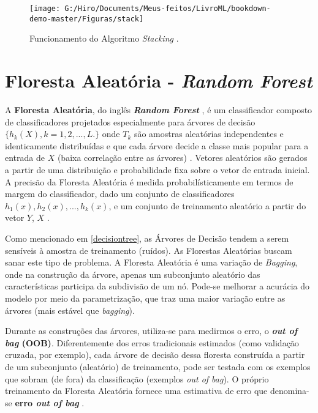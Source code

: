 \documentclass[
  openany]{book}
\begin{document}
\begin{figure}

{\centering \texttt{[image: G:/Hiro/Documents/Meus-feitos/LivroML/bookdown-demo-master/Figuras/stack]} 

}

\caption{Funcionamento do Algoritmo \emph{Stacking} \citep{bernardini2002combinaccao}.}\label{fig:stack}
\end{figure}



\hypertarget{rf}{%
\section{\texorpdfstring{Floresta Aleatória - \emph{Random Forest}}{Floresta Aleatória - Random Forest}}\label{rf}}

A \textbf{Floresta Aleatória}, do inglês \textbf{\emph{Random Forest}} \citep{breiman2001random, liaw2002classification}, é um classificador composto de classificadores projetados especialmente para árvores de decisão \(\{h_k(X),k=1,2,...,L.\}\) onde \(T_k\) são amostras aleatórias independentes e identicamente distribuídas e que cada árvore decide a classe mais popular para a entrada de \(X\) (baixa correlação entre as árvores) . Vetores aleatórios são gerados a partir de uma distribuição e probabilidade fixa sobre o vetor de entrada inicial. A precisão da Floresta Aleatória é medida probabilísticamente em termos de margem do classificador, dado um conjunto de classificadores \(h_1(x), h_2(x),...,h_k(x)\), e um conjunto de treinamento aleatório a partir do vetor \(Y\), \(X\) \citep{gomez2012random}.

Como mencionado em \ref{decisiontree}, as Árvores de Decisão tendem a serem sensíveis à amostra de treinamento (ruídos). As Florestas Aleatórias buscam sanar este tipo de problema. A Floresta Aleatória é uma variação de \emph{Bagging}, onde na construção da árvore, apenas um subconjunto aleatório das características participa da subdivisão de um nó. Pode-se melhorar a acurácia do modelo por meio da parametrização, que traz uma maior variação entre as árvores (mais estável que \emph{bagging}).

Durante as construções das árvores, utiliza-se para medirmos o erro, o \textbf{\emph{out of bag} (OOB)}. Diferentemente dos erros tradicionais estimados (como validação cruzada, por exemplo), cada árvore de decisão dessa floresta construída a partir de um subconjunto (aleatório) de treinamento, pode ser testada com os exemplos que sobram (de fora) da classificação (exemplos \emph{out of bag}). O próprio treinamento da Floresta Aleatória fornece uma estimativa de erro que denomina-se \textbf{erro \emph{out of bag} }.
\end{document}
